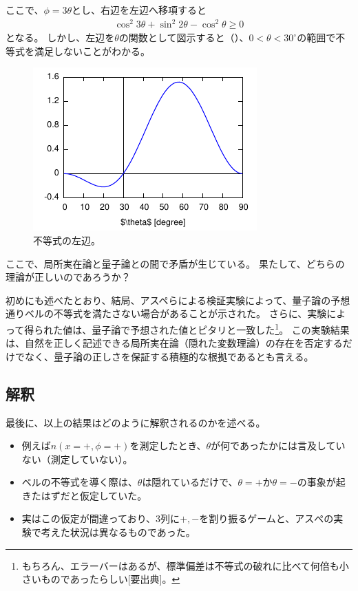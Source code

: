 \documentclass[10pt,b5paper,papersize,dvipdfmx]{jsbook}
\begin{document}
ここで、$\phi = 3\theta$とし、右辺を左辺へ移項すると
\begin{align}
  \cos^2 3\theta + \sin^2 2\theta - \cos^2\theta \ge 0
\end{align}
となる。
しかし、左辺を$\theta$の関数として図示すると（）、$0 < \theta < 30^\circ$の範囲で不等式を満足しないことがわかる。

\begin{figure}[htp]
  \centering
  \includegraphics{nkym/fig/Aspect.pdf}
  \caption{不等式の左辺。}
  \label{fig:left-hen}
\end{figure}

ここで、局所実在論と量子論との間で矛盾が生じている。
果たして、どちらの理論が正しいのであろうか？

初めにも述べたとおり、結局、アスペらによる検証実験によって、量子論の予想通りベルの不等式を満たさない場合があることが示された。
さらに、実験によって得られた値は、量子論で予想された値とピタリと一致した\footnote{
  もちろん、エラーバーはあるが、標準偏差は不等式の破れに比べて何倍も小さいものであったらしい[要出典]。
}。
この実験結果は、自然を正しく記述できる局所実在論（隠れた変数理論）の存在を否定するだけでなく、量子論の正しさを保証する積極的な根拠であるとも言える。

\subsection{解釈}

最後に、以上の結果はどのように解釈されるのかを述べる。

\begin{itemize}
  \item 例えば$n(x=+,\phi=+)$を測定したとき、$\theta$が何であったかには言及していない（測定していない）。
  \item ベルの不等式を導く際は、$\theta$は隠れているだけで、$\theta=+$か$\theta=-$の事象が起きたはずだと仮定していた。
  \item 実はこの仮定が間違っており、3列に$+,-$を割り振るゲームと、アスぺの実験で考えた状況は異なるものであった。
\end{itemize}
\end{document}
